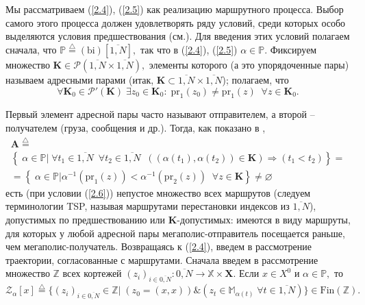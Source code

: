 \documentclass[10pt]{SPIIRAS_Proceedings}
\begin{document}
Мы рассматриваем (\ref{2.4}), (\ref{2.5})
как реализацию маршрутного процесса.
Выбор самого этого процесса должен удовлетворять
ряду условий,
среди которых особо выделяются условия предшествования (см.\cite{10}).
Для введения этих условий полагаем сначала,
что $\mathbb{P} \stackrel{\triangle}{=} (
  \mathrm{bi})[\overline{1,N}],$
так что в (\ref{2.4}), (\ref{2.5})
$\alpha \in \mathbb{P}.$
Фиксируем множество
$\mathbf{K} \in \mathcal{P}(\overline{1,N} \times \overline{1,N}),$
элементы которого
(а это упорядоченные пары)
называем адресными парами
(итак, $\mathbf{K} \subset \overline{1,N} \times \overline{1,N}$);
полагаем, что
\begin{equation}\label{2.6}
\forall{\mathbf{K}_0} \in \mathcal{P}'(\mathbf{K})\;\exists{z_0} \in \mathbf{K}_0:\;\mathrm{pr}_1(z_0)
\ne \mathrm{pr}_1(z)\;\;\forall{z} \in \mathbf{K}_0.
\end{equation}

Первый элемент адресной пары часто называют отправителем,
а второй -- получателем
(груза, сообщения и др.).
Тогда, как показано в \cite[часть 2]{14},
\begin{multline}\label{2.7}
    \mathbf{A} \stackrel{\triangle}{=} \\
    \left\{\;\alpha \in \mathbb{P} \vert\;
      \forall{t_1} \in \overline{1,N}\;\
      \forall{t_2}  \in \overline{1,N}\;\;
      ((\alpha(t_1),\alpha(t_2)) \in \mathbf{K})
      \Longrightarrow (t_1 < t_2)
    \right\} = \\
    =
    \left\{\;
      \alpha \in \mathbb{P} \vert
      \alpha^{-1}(\mathrm{pr}_1(z)) < \alpha^{-1}(\mathrm{pr}_2(z))\;\;\forall{z}
      \in \mathbf{K}
    \right\} \ne \varnothing
\end{multline}
есть (при условии (\ref{2.6}))
непустое множество всех маршрутов
(следуем терминологии TSP,
называя маршрутами перестановки индексов из $\overline{1,N}$),
допустимых по предшествованию или $\mathbf{K}$-допустимых:
имеются в виду маршруты,
для которых у любой адресной пары мегаполис-отправитель посещается раньше,
чем мегаполис-получатель.
Возвращаясь к (\ref{2.4}),
введем в рассмотрение траектории,
согласованные с маршрутами.
Сначала введем в рассмотрение множество
$\mathbb{Z}$ всех кортежей
$(z_i)_{i \in \overline{0,N}}: \overline{0,N} \longrightarrow \mathbb{X} \times \mathbf{X}.$
Если $x \in X^0$ и $\alpha \in \mathbb{P},$
то
\begin{equation}\label{2.8}
\mathcal{Z}_\alpha[x] \stackrel{\triangle}{=} \{(z_i)_{i \in \overline{0,N}}
\in \mathbb{Z} \vert\;(z_0 = (x,x)) \& (z_t \in \mathbb{M}_{\alpha(t)}\;\forall{t} \in \overline{1,N})\} \in \mathrm{Fin}(\mathbb{Z}).
\end{equation}
\end{document}

